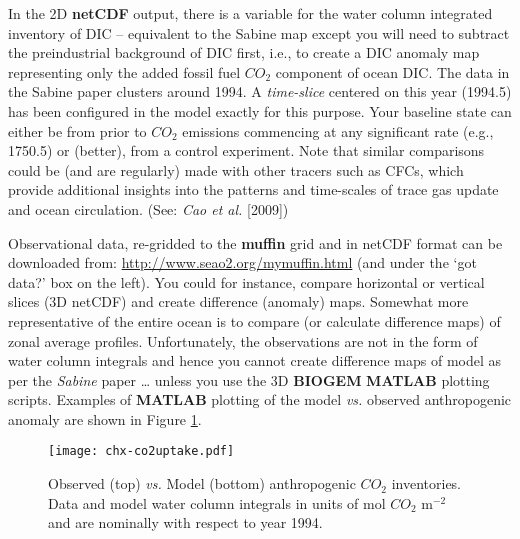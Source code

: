 In the 2D \textbf{netCDF} output, there is a variable for the water column integrated inventory of DIC – equivalent to the Sabine map except you will need to subtract the preindustrial background of DIC first, i.e., to create a DIC anomaly map representing only the added fossil fuel \(CO_{2}\) component of ocean DIC. The data in the Sabine paper clusters around 1994. A \textit{time-slice} centered on this year (1994.5) has been configured in the model exactly for this purpose. Your baseline state can either be from prior to \(CO_{2}\) emissions commencing at any significant rate (e.g., 1750.5) or (better), from a control experiment. Note that similar comparisons could be (and are regularly) made with other tracers such as CFCs, which provide additional insights into the patterns and time-scales of trace gas update and ocean circulation. (See: \textit{Cao et al.} [2009])

\vspace{1mm}

Observational data, re-gridded to the \textbf{muffin} grid and in netCDF format can be downloaded from: \href{http://www.seao2.org/mymuffin.html}{http://www.seao2.org/mymuffin.html} (and under the ‘got data?’ box on the left). You could for instance, compare horizontal or vertical slices (3D netCDF) and create difference (anomaly) maps. Somewhat more representative of the entire ocean is to compare (or calculate difference maps) of zonal average profiles. Unfortunately, the observations are not in the form of water column integrals and hence you cannot create difference maps of model as per the \textit{Sabine} paper … unless you use the 3D \textbf{BIOGEM} \textbf{MATLAB} plotting scripts. Examples of \textbf{MATLAB} plotting of the model \textit{vs.} observed anthropogenic anomaly are shown in Figure \ref{fig:chx-co2uptake}.

\vspace{2mm}

\begin{figure}[ht]
\begin{center}
\texttt{[image: chx-co2uptake.pdf]}
\end{center}
\vspace{-10pt}
\caption{Observed (top) \textit{vs.} Model (bottom) anthropogenic \(CO_{2}\) inventories.
Data and model water column integrals in units of mol \(CO_{2}\) m$^{-2}$ and are nominally with respect to year 1994.}
\label{fig:chx-co2uptake}
\end{figure}

\newpage

